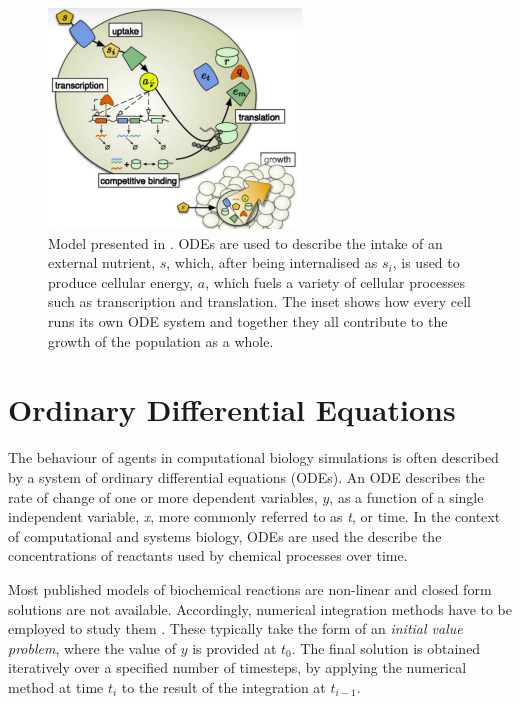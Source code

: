 \documentclass[bsc,frontabs,singlespacing,parskip,deptreport]{infthesis}
\begin{document}
\begin{figure}
    \centering
    \includegraphics[width=0.6\textwidth]{Images/Other/weisse_model.pdf}
    \caption{Model presented in \cite{P21}. ODEs are used to describe the intake of an external nutrient, $s$, which, after being internalised as $s_{i}$, is used to produce cellular energy, $a$, which fuels a variety of cellular processes such as transcription and translation. The inset shows how every cell runs its own ODE system and together they all contribute to the growth of the population as a whole.}
    \label{fig:weisse_model}
\end{figure}

\section{Ordinary Differential Equations}\label{sec:odes}
The behaviour of agents in computational biology simulations is often described by a system of ordinary differential equations (ODEs). An ODE describes the rate of change of one or more dependent variables, $y$, as a function of a single independent variable, \textit{x}, more commonly referred to as \textit{t}, or time. In the context of computational and systems biology, ODEs are used the describe the concentrations of reactants used by chemical processes over time.

Most published models of biochemical reactions are non-linear and closed form solutions are not available. Accordingly, numerical integration methods have to be employed to study them \cite{Stadter2021}. These typically take the form of an \textit{initial value problem}, where the value of $y$ is provided at \textit{$t_{0}$}. The final solution is obtained iteratively over a specified number of timesteps, by applying the numerical method at time \textit{$t_{i}$} to the result of the integration at \textit{$t_{i-1}$}.
\end{document}
